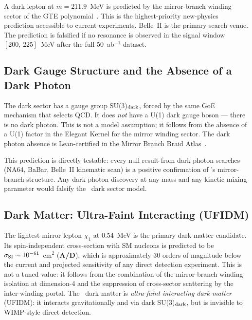 \documentclass[11pt,openany]{book}
\theoremstyle{remark}
\newcommand{\GTE}{\text{GTE}}
\newcommand{\CatAD}{\textbf{A/D}}
\begin{document}
\begin{tcolorbox}[colback=orange!5,colframe=orange!60,
  title={Result: GTE-P7 Dark Resonance (\CatAD)}]
A dark lepton at $m = 211.9$~MeV is predicted by the mirror-branch winding sector
of the GTE polynomial~\cite{SpivackMirrorBraidAtlas}.  This is the highest-priority
new-physics prediction accessible to current experiments.  Belle~II is the primary
search venue.  The prediction is falsified if no resonance is observed in the signal
window $[200,\,225]$~MeV after the full 50~ab$^{-1}$ dataset.
\end{tcolorbox}

\subsection*{Dark Gauge Structure and the Absence of a Dark Photon}

The dark sector has a gauge group SU(3)$_{\rm dark}$, forced by the same GoE
mechanism that selects QCD.  It does \emph{not} have a U(1) dark gauge boson --- there
is no dark photon.  This is not a model assumption; it follows from the absence of a
U(1) factor in the Elegant Kernel for the mirror winding sector.  The dark photon
absence is Lean-certified in the Mirror Branch Braid Atlas~\cite{SpivackMirrorBraidAtlas}.

This prediction is directly testable: every null result from dark photon searches (NA64,
BaBar, Belle~II kinematic scan) is a positive confirmation of \GTE's mirror-branch
structure.  Any dark photon discovery at any mass and any kinetic mixing parameter would
falsify the \GTE\ dark sector model.

\subsection*{Dark Matter: Ultra-Faint Interacting (UFIDM)}

The lightest mirror lepton $\chi_1$ at 0.54~MeV is the primary dark matter candidate.
Its spin-independent cross-section with SM nucleons is predicted to be
$\sigma_{\rm SI} \sim 10^{-61}$~cm$^2$ (\CatAD), which is approximately 30 orders of
magnitude below the current and projected sensitivity of any direct detection experiment.
This is not a tuned value: it follows from the combination of the mirror-branch winding
isolation at dimension-4 and the suppression of cross-sector scattering by the
inter-winding portal.  The \GTE\ dark matter is \emph{ultra-faint interacting dark
matter} (UFIDM): it interacts gravitationally and via dark SU(3)$_{\rm dark}$, but
is invisible to WIMP-style direct detection.
\end{document}
